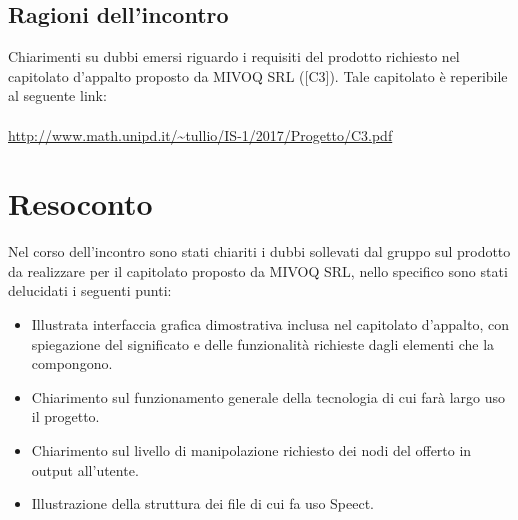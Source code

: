 \documentclass[openany,12pt,a4paper]{article}
\begin{document}
	\subsection{Ragioni dell'incontro}
	
	Chiarimenti su dubbi emersi riguardo i requisiti del prodotto richiesto nel capitolato d'appalto proposto da MIVOQ SRL ([C3]). Tale capitolato è reperibile al seguente link:
	\\ 
	\\ \url{http://www.math.unipd.it/~tullio/IS-1/2017/Progetto/C3.pdf}
	
	\section{Resoconto}
	
	Nel corso dell'incontro sono stati chiariti i dubbi sollevati dal gruppo sul prodotto da realizzare per il capitolato proposto da MIVOQ SRL, nello specifico sono stati delucidati i seguenti punti:
	
	\begin{itemize}
	    \item Illustrata interfaccia grafica dimostrativa inclusa nel capitolato d'appalto, con spiegazione del significato e delle funzionalità richieste dagli elementi che la compongono.
	    \item Chiarimento sul funzionamento generale della tecnologia  di cui farà largo uso il progetto.
	    \item Chiarimento sul livello di manipolazione richiesto dei nodi del  offerto in output all'utente.
	    \item Illustrazione della struttura dei file  di cui fa uso Speect.
	\end{itemize}
	
	
	
	
\end{document}
